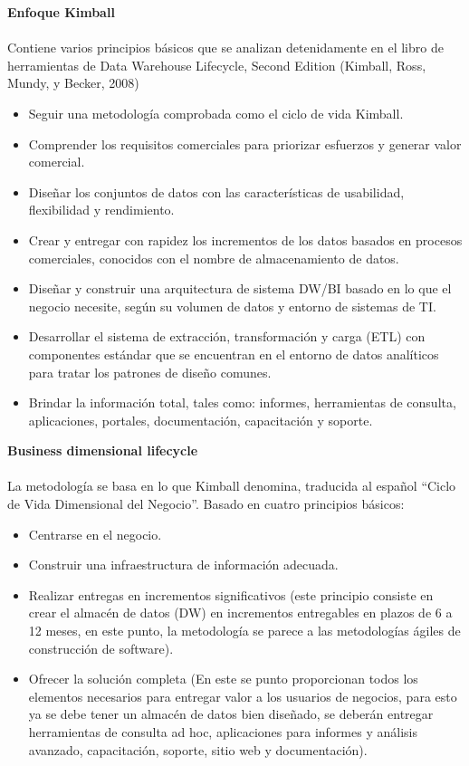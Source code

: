 \documentclass[twoside,twocolumn]{article}
\begin{document}
\begin{enumerate}
\textbf{Enfoque Kimball}
\\ \\
Contiene varios principios básicos que se analizan detenidamente en el libro de herramientas de Data Warehouse Lifecycle, Second Edition (Kimball, Ross, Mundy, y Becker, 2008)
\begin{itemize}
\item Seguir una metodología comprobada como el  ciclo de vida Kimball.
\item Comprender los requisitos comerciales para priorizar esfuerzos y generar valor comercial. 
\item Diseñar los conjuntos de datos con las características de usabilidad, flexibilidad y rendimiento.
\item Crear y entregar con rapidez los incrementos de los datos basados en procesos comerciales, conocidos con el nombre de almacenamiento de datos. 
\item Diseñar y construir una arquitectura de sistema DW/BI basado en lo que el negocio necesite, según su volumen de datos y entorno de sistemas de TI. 
\item Desarrollar el sistema de extracción, transformación y carga (ETL) con componentes estándar que se encuentran en el entorno de datos analíticos para tratar los patrones de diseño comunes.
\item Brindar la información total, tales como: informes, herramientas de consulta, aplicaciones, portales, documentación, capacitación y soporte.
\end{itemize}



\textbf{Business dimensional lifecycle}
\\ \\
La metodología se basa en lo que Kimball denomina, traducida al español “Ciclo de Vida Dimensional del Negocio”. Basado en cuatro principios básicos:

\begin{itemize}
\item Centrarse en el negocio.
\item Construir una infraestructura de información adecuada.
\item Realizar entregas en incrementos significativos (este principio consiste en crear el almacén de datos (DW) en incrementos entregables en plazos de 6 a 12 meses, en este punto, la metodología se parece a las metodologías ágiles de construcción de software).
\item Ofrecer la solución completa (En este se punto proporcionan todos los elementos necesarios para entregar valor a los usuarios de negocios, para esto ya se debe tener un almacén de datos bien diseñado, se deberán entregar herramientas de consulta ad hoc, aplicaciones para informes y análisis avanzado, capacitación, soporte, sitio web y documentación).


\end{itemize}
\end{enumerate}
\end{document}
